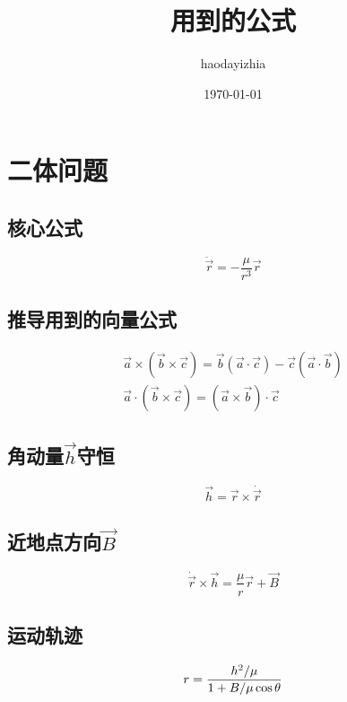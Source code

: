 \documentclass[UTF8]{ctexart}
\title{用到的公式}
\author{haodayizhia}
\date{\today}
\begin{document}
\renewcommand\theequation{%
\thesection.\arabic{equation}}

\maketitle
\tableofcontents
\section{二体问题}

\subsection{核心公式}
\begin{equation}
	\ddot{\vec{r}}=-\frac{\mu}{r^3}\vec{r}
\end{equation}

\subsection{推导用到的向量公式}

\begin{gather}
\vec{a}\times(\vec{b}\times\vec c) =\vec{b}(\vec{a}\cdot\vec{c})-\vec{c}(\vec{a}\cdot\vec{b})\\
\vec{a}\cdot(\vec{b}\times\vec{c})=(\vec{a}\times\vec{b})\cdot\vec{c}
\end{gather}

\subsection{角动量$\vec{h}$守恒}
\begin{equation}
	\vec{h}=\vec{r}\times\dot{\vec{r}}
\end{equation}

\subsection{近地点方向$\vec{B}$}
\begin{equation}
	\dot{\vec{r}}\times\vec{h}=\frac{\mu}{r}\vec{r}+\vec{B}
\end{equation}

\subsection{运动轨迹}
\begin{equation}
	r=\frac{h^2/\mu}{1+B/\mu\cos \theta}\\
\end{equation}
\end{document}
